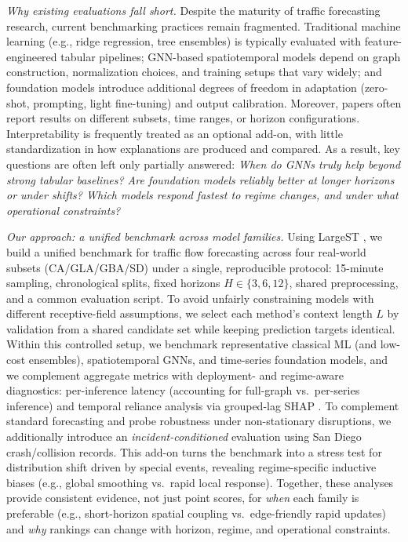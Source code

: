 \documentclass[10pt]{article}
\begin{document}
\textit{Why existing evaluations fall short.}
Despite the maturity of traffic forecasting research, current benchmarking practices remain fragmented. Traditional machine learning (e.g., ridge regression, tree ensembles) is typically evaluated with feature-engineered tabular pipelines; GNN-based spatiotemporal models depend on graph construction, normalization choices, and training setups that vary widely; and foundation models introduce additional degrees of freedom in adaptation (zero-shot, prompting, light fine-tuning) and output calibration. Moreover, papers often report results on different subsets, time ranges, or horizon configurations. Interpretability is frequently treated as an optional add-on, with little standardization in how explanations are produced and compared. As a result, key questions are often left only partially answered: \emph{When do GNNs truly help beyond strong
tabular baselines? Are foundation models reliably better at longer horizons or under shifts? Which models respond
fastest to regime changes, and under what operational constraints?}


\textit{Our approach: a unified benchmark across model families.}
Using {LargeST} \citep{liu2023largest}, we build a unified benchmark for traffic flow forecasting across four
real-world subsets (CA/GLA/GBA/SD) under a single, reproducible protocol: 15-minute sampling, chronological splits,
fixed horizons $H \in \{3,6,12\}$, shared preprocessing, and a common evaluation script. To avoid unfairly constraining models with different receptive-field assumptions, we select each method's context length $L$ by validation from a shared candidate set while keeping prediction targets identical. Within this controlled setup, we benchmark
representative classical ML (and low-cost ensembles), spatiotemporal GNNs, and time-series foundation models, and we complement aggregate metrics with deployment- and regime-aware diagnostics: per-inference latency (accounting for
full-graph vs.\ per-series inference) and temporal reliance analysis via grouped-lag SHAP \citep{lundberg2017shap}. To complement standard forecasting and probe robustness under non-stationary disruptions, we additionally
introduce an \emph{incident-conditioned} evaluation using San Diego crash/collision records. This add-on turns the
benchmark into a stress test for distribution shift driven by special events, revealing regime-specific inductive
biases (e.g., global smoothing vs.\ rapid local response).
Together, these analyses provide consistent evidence, not just point scores, for \emph{when} each family is
preferable (e.g., short-horizon spatial coupling vs.\ edge-friendly rapid updates) and \emph{why} rankings can change
with horizon, regime, and operational constraints.
\end{document}
